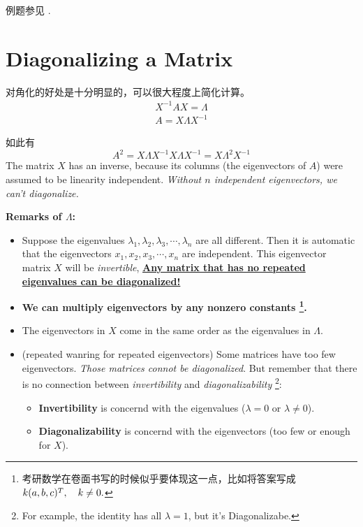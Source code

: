 例题参见 \cite[page 295]{strang}.

\section{Diagonalizing a Matrix}

对角化的好处是十分明显的，可以很大程度上简化计算。
\begin{gather*}
    X^{-1} AX = \Lambda \\
    A = X\Lambda X^{-1}
\end{gather*}

如此有
\[
    A^2 =X\Lambda X^{-1}X\Lambda X^{-1} = X\Lambda^2X^{-1}
\]
The matrix $X$ has an inverse, because its columns (the eigenvectors of $A$)
were assumed to be linearity independent. 
\emph{Without $n$ independent eigenvectors, we can't diagonalize.}

\textbf{Remarks of $\Lambda$:}
\begin{itemize}
    \item Suppose the eigenvalues $\lambda_1, \lambda_2, \lambda_3, \cdots, \lambda_n$ are all different.
        Then it is automatic that the eigenvectors $x_1, x_2, x_3, \cdots, x_n$ are independent.
        This eigenvector matrix $X$ will be \emph{invertible},
        \textbf{\uline{Any matrix that has no repeated eigenvalues can be diagonalized!}}
    \item \textbf{
        We can multiply eigenvectors by any nonzero constants
        \footnote{
            考研数学在卷面书写的时候似乎要体现这一点，比如将答案写成 
            $\cramped{k(a, b, c)^T, \quad k \neq 0.}$
        }.
    }
    \item The eigenvectors in $X$ come in the same order as the eigenvalues in $\Lambda$.
    \item (repeated wanring for repeated eigenvectors) 
        Some matrices have too few eigenvectors. 
        \emph{Those matrices connot be diagonalized}\cite[page 305]{strang}.
        But remember that there is no connection 
        between \emph{invertibility} and \emph{diagonalizability}
        \footnote{
            For example, the identity has all $\lambda = 1$, but it's Diagonalizabe.
        }:\begin{itemize}
            \item \textbf{Invertibility} is concernd 
                with the eigenvalues ($\lambda = 0$ or $\lambda \neq 0$).
            \item \textbf{Diagonalizability} is concernd 
                with the eigenvectors (too few or enough for $X$).
        \end{itemize}
\end{itemize}


